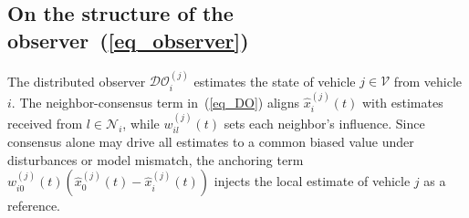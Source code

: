 \documentclass{ifacconf}
\def\eqref#1{(\ref{#1})}
\def\N{\mathcal{N}} %
\def\DO{\mathcal{DO}} %
\newtheorem{remark}{\it \textbf{Remark}}%
\begin{document}
\subsection{On the structure of the observer~\eqref{eq_observer}}
\vspace*{-0.3cm}
%
The distributed observer $\DO_i^{(j)}$ estimates the state of vehicle $j \in \mathcal{V}$ from vehicle $i$. 
The neighbor-consensus term in~\eqref{eq_DO} aligns $\hat{x}_i^{(j)}(t)$ with estimates received from $l \in \N_i$, while $w_{il}^{(j)}(t)$ sets each neighbor's influence. Since consensus alone may drive all estimates to a common biased value under disturbances or model mismatch, the anchoring term $w_{i0}^{(j)}(t)(\hat{x}_0^{(j)}(t)-\hat{x}_i^{(j)}(t))$ injects the local estimate of vehicle $j$ as a reference.




\end{document}
